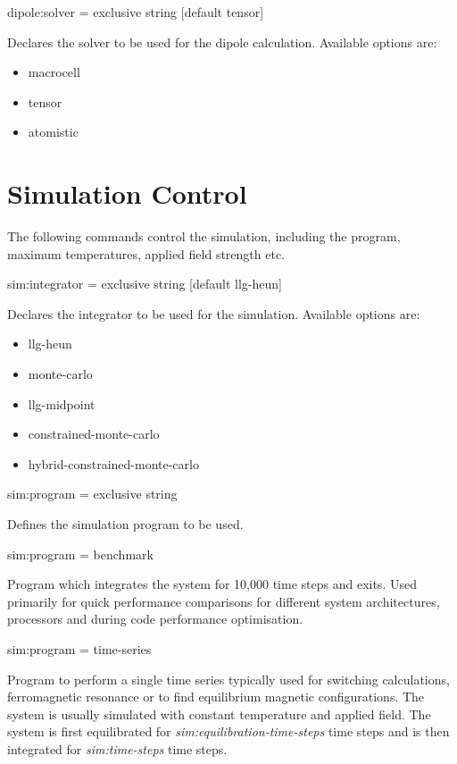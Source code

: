 {\zicf dipole:solver = exclusive string [default tensor]}
Declares the solver to be used for the dipole calculation. Available options are:
\begin{itemize}
  \item[] macrocell
  \item[] tensor
  \item[] atomistic
\end{itemize}

\section*{Simulation Control}
The following commands control the simulation, including the program, maximum temperatures, applied field strength etc.

{\zicf sim:integrator = exclusive string [default llg-heun]} Declares the integrator to be used for the simulation. Available options are:
\begin{itemize}
  \item[] llg-heun
  \item[] monte-carlo
  \item[] llg-midpoint
  \item[] constrained-monte-carlo
  \item[] hybrid-constrained-monte-carlo
\end{itemize}

{\zicf sim:program = exclusive string} Defines the simulation program to be used.

{\zicf sim:program = benchmark} Program which integrates the system for 10,000 time steps and exits. Used primarily for quick performance comparisons for different system architectures, processors and during code performance optimisation.

{\zicf sim:program = time-series} Program to perform a single time series typically used for switching calculations, ferromagnetic resonance or to find equilibrium magnetic configurations. The system is usually simulated with constant temperature and applied field. The system is first equilibrated for \textit{sim:equilibration-time-steps} time steps and is then integrated for \textit{sim:time-steps} time steps.

